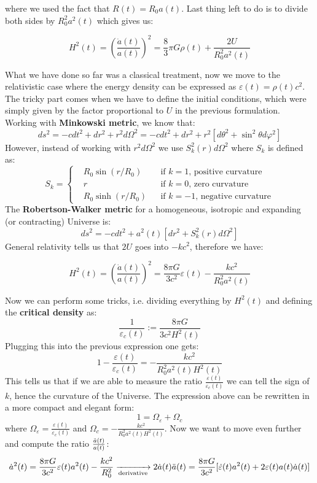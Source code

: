 \documentclass[10.75pt,a4paper,openright,bottom=2cm]{article}
\newcommand{\beginbox}[1]{\begin{tcolorbox}[width=\textwidth,colback={black!40},title={#1},colbacktitle={purple!55},coltitle=black]}
\renewcommand{\endbox}{\end{tcolorbox}\noindent}
\begin{document}
where we used the fact that $R(t)=R_0a(t)$. Last thing left to do is to divide both sides by $R_0^2a^2(t)$ which gives us:
\beginbox{Friedmann Equation (classical derivation)}
\[
H^2(t)=\left(\frac{\Dot{a}(t)}{a(t)}\right)^2=\frac{8}{3}\pi G\rho(t)+\frac{2U}{R_0^2a^2(t)}
\]
\endbox
What we have done so far was a classical treatment, now we move to the relativistic case where the energy density can be expressed as $\varepsilon(t)=\rho(t)c^2$. The tricky part comes when we have to define the initial conditions, which were simply given by the factor proportional to $U$ in the previous formulation. Working with \textbf{Minkowski metric}, we know that:
\[
ds^2=-cdt^2+dr^2+r^2d\Omega^2=-cdt^2+dr^2+r^2[d\theta^2+\sin^2\theta d\varphi^2]
\]
However, instead of working with $r^2d\Omega^2$ we use $S_k^2(r)d\Omega^2$ where $S_k$ is defined as:
\[
S_k=\left\{\begin{aligned}
&R_0\sin(r/R_0) &&\text{if $k=1$, positive curvature}\\
&r &&\text{if $k=0$, zero curvature}\\
&R_0\sinh(r/R_0) &&\text{if $k=-1$, negative curvature}
\end{aligned}\right.
\]
The \textbf{Robertson-Walker metric} for a homogeneous, isotropic and expanding (or contracting) Universe is:
\[
ds^2=-cdt^2+a^2(t)[dr^2+S_k^2(r)d\Omega^2]
\]
General relativity tells us that $2U$ goes into $-kc^2$, therefore we have:
\beginbox{Friedmann Equation (relativistic version)}
\[
H^2(t)=\left(\frac{\Dot{a}(t)}{a(t)}\right)^2=\frac{8\pi G}{3c^2}\varepsilon(t)-\frac{kc^2}{R_0^2a^2(t)}
\]
\endbox
Now we can perform some tricks, i.e. dividing everything by $H^2(t)$ and defining the \textbf{critical density} as:
\[
\frac{1}{\varepsilon_c(t)}:=\frac{8\pi G}{3c^2H^2(t)}
\]
Plugging this into the previous expression one gets:
\[
1-\frac{\varepsilon(t)}{\varepsilon_c(t)}=-\frac{kc^2}{R_0^2a^2(t)H^2(t)}
\]
This tells us that if we are able to measure the ratio $\frac{\varepsilon(t)}{\varepsilon_c(t)}$ we can tell the sign of $k$, hence the curvature of the Universe. The expression above can be rewritten in a more compact and elegant form:
\[
1=\Omega_\varepsilon+\Omega_c
\]
where $\Omega_\varepsilon=\frac{\varepsilon(t)}{\varepsilon_c(t)}$ and $\Omega_c=-\frac{kc^2}{R_0^2a^2(t)H^2(t)}$. Now we want to move even further and compute the ratio $\frac{\Ddot{a}(t)}{a(t)}$:
\[
\Dot{a}^2(t)=\frac{8\pi G}{3c^2}\varepsilon(t)a^2(t)-\frac{kc^2}{R_0^2}\xrightarrow[\text{derivative}]{}2\Dot{a}(t)\Ddot{a}(t)=\frac{8\pi G}{3c^2}[\Dot{\varepsilon}(t)a^2(t)+2\varepsilon(t)a(t)\Dot{a}(t)]
\]
\end{document}
